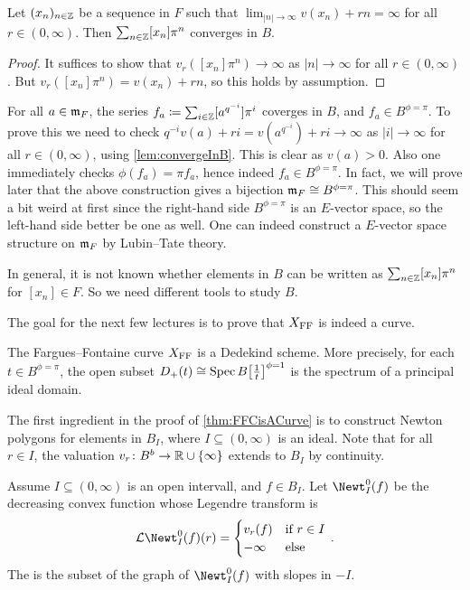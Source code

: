 \begin{lem}\label{lem:convergeInB}
	Let $(x_n)_{n\in\mathbb{Z}}$ be a sequence in $F$ such that $\lim_{|n|\to\infty}v(x_n)+rn=\infty$ for all $r\in(0,\infty)$. Then $\sum_{n\in\mathbb{Z}}[x_n]\pi^n$ converges in $B$.
\end{lem}
\begin{proof}
	It suffices to show that $v_r([x_n]\pi^n)\to\infty$ as $|n|\to\infty$ for all $r\in(0,\infty)$. But $v_r([x_n]\pi^n)=v(x_n)+rn$, so this holds by assumption.
\end{proof}
\begin{rem}\label{lem:convergenceInB}
	\begin{numerate}
		\item For all $a\in \mathfrak{m}_F$, the series $f_a\coloneqq \sum_{i\in\mathbb{Z}}[a^{q^{-i}}]\pi^i$ coverges in $B$, and $f_a\in B^{\phi=\pi}$. To prove this we need to check $q^{-i}v(a)+ri=v(a^{q^{-i}})+ri\to \infty$ as $|i|\to\infty$ for all $r\in(0,\infty)$, using \cref{lem:convergeInB}. This is clear as $v(a)>0$. Also one immediately checks $\phi(f_a)=\pi f_a$, hence indeed $f_a\in B^{\phi=\pi}$. In fact, we will prove later that the above construction gives a bijection $\mm_F\cong B^{\phi=\pi}$. This should seem a bit weird at first since the right-hand side $B^{\phi=\pi}$ is an $E$-vector space, so the left-hand side better be one as well. One can indeed construct a $E$-vector space structure on $\mathfrak{m}_F$ by Lubin--Tate theory.
		\item In general, it is not known whether elements in $B$ can be written as $\sum_{n\in\mathbb{Z}}[x_n]\pi^n$ for $[x_n]\in F$. So we need different tools to study $B$.
	\end{numerate}
\end{rem}
The goal for the next few lectures is to prove that $X_{\mathrm{FF}}$ is indeed a curve.
\begin{mainthm}\label{thm:FFCisACurve}
	The Fargues--Fontaine curve $X_{\mathrm{FF}}$ is a Dedekind scheme. More precisely, for each $t\in B^{\phi=\pi}$, the open subset $D_+(t)\cong \Spec B\big[\frac 1t\big]^{\phi=1}$ is the spectrum of a principal ideal domain.
\end{mainthm}
The first ingredient in the proof of \cref{thm:FFCisACurve} is to construct Newton polygons for elements in $B_I$, where $I\subseteq (0,\infty)$ is an ideal. Note that for all $r\in I$, the valuation $v_r\colon B^b\morphism \IR\cup\{\infty\}$ extends to $B_I$ by continuity.
\begin{defi}\label{def:NewtOpen}
	Assume $I\subseteq (0,\infty)$ is an open intervall, and $f\in B_I$. Let $\Newt_I^0(f)$ be the decreasing convex function whose Legendre transform is
	\begin{equation*}
		\Ll\Newt_I^0(f)(r)=\begin{cases}
		v_r(f) & \text{if }r\in I\\
		-\infty & \text{else}
		\end{cases}\,.
	\end{equation*}
	The  is the subset of the graph of $\Newt_I^0(f)$ with slopes in $-I$.
\end{defi}
